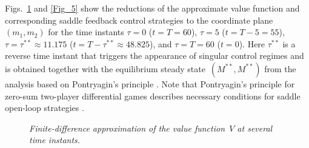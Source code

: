 \documentclass[11pt]{amsart}
\begin{document}
Figs.~\ref{Fig_4} and \ref{Fig_5} show the reductions of the approximate
value function and corresponding saddle feedback control strategies to the
coordinate plane $ (m_1, m_2) $ for the time instants 
$ \tau = 0 $ ($ t = T = 60 $), $ \tau = 5 $ ($ t = T - 5 = 55 $),
$ \tau = \tau^{**} \approx 11.175 $ ($ t = T - \tau^{**} \approx 48.825 $),
and $ \tau = T = 60 $ ($ t = 0 $). Here $ \tau^{**} $ is a reverse time instant
that triggers the appearance of singular control regimes and is obtained
together with the equilibrium steady state~$ \left( M^{**}, M^{**} \right) $
from the analysis based on Pontryagin's principle 
\cite{YegorovGrognardMailleretHalkettBernhard2019}. Note that Pontryagin's
principle for zero-sum two-player differential games describes necessary
conditions for saddle open-loop strategies \cite{Yong2015}.

\begin{figure}
\bf \caption{\it Finite-difference approximation of the value function~$ V $
                 at several time instants.}
\label{Fig_4}
\end{figure}
\end{document}

